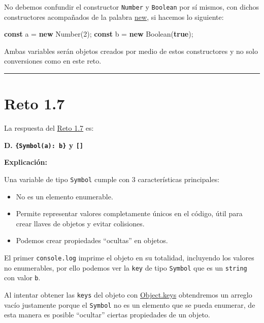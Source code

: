 \documentclass[
  letterpaper,
  DIV=11,
  numbers=noendperiod]{scrreprt}
\newenvironment{Shaded}{\begin{snugshade}}{\end{snugshade}}
\newcommand{\BuiltInTok}[1]{\textcolor[rgb]{0.00,0.23,0.31}{#1}}
\newcommand{\DecValTok}[1]{\textcolor[rgb]{0.68,0.00,0.00}{#1}}
\newcommand{\KeywordTok}[1]{\textcolor[rgb]{0.00,0.23,0.31}{\textbf{#1}}}
\newcommand{\NormalTok}[1]{\textcolor[rgb]{0.00,0.23,0.31}{#1}}
\newcommand{\OperatorTok}[1]{\textcolor[rgb]{0.37,0.37,0.37}{#1}}
\providecommand{\tightlist}{%
  \setlength{\itemsep}{0pt}\setlength{\parskip}{0pt}}
\begin{document}
No debemos confundir el constructor \texttt{Number} y \texttt{Boolean}
por sí mismos, con dichos constructores acompañados de la palabra
\hyperref[glos-new]{new}, si hacemos lo siguiente:

\begin{Shaded}
\begin{Highlighting}[]
\KeywordTok{const}\NormalTok{ a }\OperatorTok{=} \KeywordTok{new} \BuiltInTok{Number}\NormalTok{(}\DecValTok{2}\NormalTok{)}\OperatorTok{;}
\KeywordTok{const}\NormalTok{ b }\OperatorTok{=} \KeywordTok{new} \BuiltInTok{Boolean}\NormalTok{(}\KeywordTok{true}\NormalTok{)}\OperatorTok{;}
\end{Highlighting}
\end{Shaded}

Ambas variables serán objetos creados por medio de estos constructores y
no solo conversiones como en este reto.

\begin{center}\rule{0.5\linewidth}{0.5pt}\end{center}

\section{Reto 1.7}\label{sec-sol-cap1-reto7}

La respuesta del \hyperref[sec-cap1-reto7]{Reto 1.7} es:

\textbf{D.
\texttt{\{Symbol(\textquotesingle{}a\textquotesingle{}):\ \textquotesingle{}b\textquotesingle{}\}}
y \texttt{{[}{]}}}

\textbf{Explicación:}

Una variable de tipo \texttt{Symbol} cumple con 3 características
principales:

\begin{itemize}
\tightlist
\item
  No es un elemento enumerable.
\item
  Permite representar valores completamente únicos en el código, útil
  para crear llaves de objetos y evitar colisiones.
\item
  Podemos crear propiedades ``ocultas'' en objetos.
\end{itemize}

El primer \texttt{console.log} imprime el objeto en su totalidad,
incluyendo los valores no enumerables, por ello podemos ver la
\texttt{key} de tipo \texttt{Symbol} que es un \texttt{string} con valor
\texttt{b}.

Al intentar obtener las \texttt{keys} del objeto con
\hyperref[glos-object_keys]{Object.keys} obtendremos un arreglo vacío
justamente porque el \texttt{Symbol} no es un elemento que se pueda
enumerar, de esta manera es posible ``ocultar'' ciertas propiedades de
un objeto.
\end{document}

